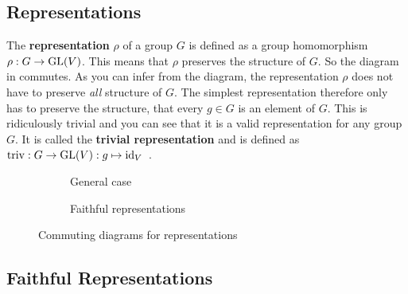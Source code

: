 \subsection{Representations}

The \textbf{representation} $\rho$ of a group $G$ is defined as a group homomorphism $\rho: G \to \operatorname{GL}(V)$.
This means that $\rho$ preserves the structure of $G$.
So the diagram in  commutes.
As you can infer from the diagram, the representation $\rho$ does not have to preserve \textit{all} structure of $G$.
The simplest representation therefore only has to preserve the structure, that every $g \in G$ is an element of $G$.
This is ridiculously trivial and you can see that it is a valid representation for any group $G$.
It is called the \textbf{trivial representation} and is defined as $\operatorname{triv}: G \to \operatorname{GL}(V): g \mapsto \operatorname{id}_V$~\cite{hein2013}.

\begin{figure}[h]
    \begin{subfigure}{.5 \textwidth}
        \centering
        \caption{General case}
        \label{fig:main.what.rep-cd}
    \end{subfigure}
    \begin{subfigure}{.5 \textwidth}
        \centering
        \caption{Faithful representations}
        \label{fig:main.what.faith-rep-cd}
    \end{subfigure}
    \caption{Commuting diagrams for representations}
\end{figure}

\subsection{Faithful Representations}
\label{sec:basics.rep.faith}

